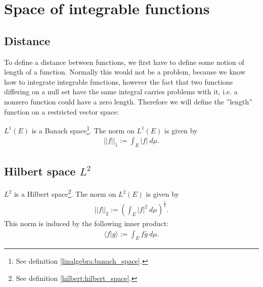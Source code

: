 \section{Space of integrable functions}
\subsection{Distance}

    To define a distance between functions, we first have to define some notion of length of a function. Normally this would not be a problem, because we know how to integrate integrable functions, however the fact that two functions differing on a null set have the same integral carries problems with it, i.e. a nonzero function could have a zero length. Therefore we will define the ''length'' function on a restricted vector space:
    \begin{property}
        $L^1(E)$ is a Banach space\footnote{See definition \ref{linalgebra:banach_space}.}. The norm on $L^1(E)$ is given by
        \begin{gather}
            \label{lebesgue:L1_norm}
            ||f||_1 := \int_E |f|\ d\mu.
        \end{gather}
    \end{property}

\subsection{Hilbert space \texorpdfstring{$L^2$}{L2}}\label{lebesgue:section:hilbert_space}

    \begin{property}\label{lebesgue:L2_hilbert_space}
        $L^2$ is a Hilbert space\footnote{See definition \ref{hilbert:hilbert_space}.}. The norm on $L^2(E)$ is given by
        \begin{gather}
            \label{lebesgue:L2_norm}
            ||f||_2 := \left(\int_E |f|^2\ d\mu\right)^{\frac{1}{2}}.
        \end{gather}
        This norm is induced by the following inner product:
        \begin{gather}
            \label{lebesgue:L2_inner_product}
            \langle f|g \rangle := \int_E f\overline{g}\ d\mu.
        \end{gather}
    \end{property}

